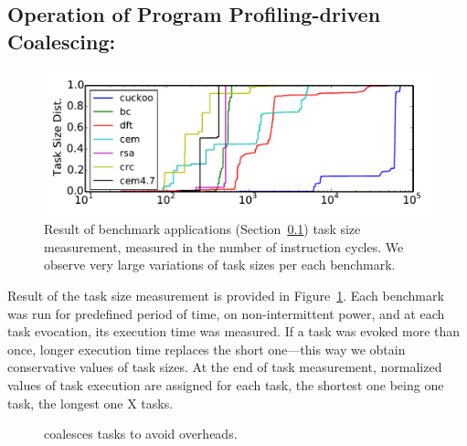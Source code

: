 \subsection{Operation of Program Profiling-driven Coalescing:} 

\begin{figure}
	\centering
	\includegraphics[width=\columnwidth]{figures/TskDist.pdf}
	\caption{Result of benchmark applications (Section~\ref{}) task size measurement, measured in the number of instruction cycles. We observe very large variations of task sizes per each benchmark. }
\label{fig:task_profiling}
\end{figure}

Result of the task size measurement is provided in Figure~\ref{fig:task_profiling}. Each benchmark was run for predefined period of time, on non-intermittent power, and at each task evocation, its execution time was measured. If a task was evoked more than once, longer execution time replaces the short one---this way we obtain conservative values of task sizes. At the end of task measurement, normalized values of task execution are assigned for each task, the shortest one being one task, the longest one X tasks.

\begin{figure}
	\centering
	\caption{\sys coalesces tasks to avoid overheads.}
	\label{fig:coalescing_example}
\end{figure}

